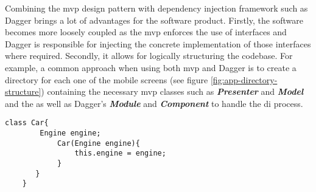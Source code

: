         
    Combining the \gls{mvp} design pattern with dependency injection framework such as Dagger brings a lot of advantages for the software product. Firstly, the software becomes more loosely coupled as the \gls{mvp} enforces the use of interfaces and Dagger is responsible for injecting the concrete implementation of those interfaces where required. Secondly, it allows for logically structuring the codebase. For example, a common approach when using both \gls{mvp} and Dagger is to create a directory for each one of the mobile screens (see figure \ref{fig:app-directory-structure}) containing the necessary \gls{mvp} classes such as \textit{\textbf{Presenter}} and \textit{\textbf{Model}} and the as well as Dagger's \textit{\textbf{Module}} and \textit{\textbf{Component}} to handle the \gls{di} process.
    
\begin{lstlisting}[caption= DI example, label=di-car-example,frame=tlrbr,basicstyle=\small,captionpos=b]
    class Car{
        Engine engine;
            Car(Engine engine){
                this.engine = engine;
            }
       }
    }
\end{lstlisting}
